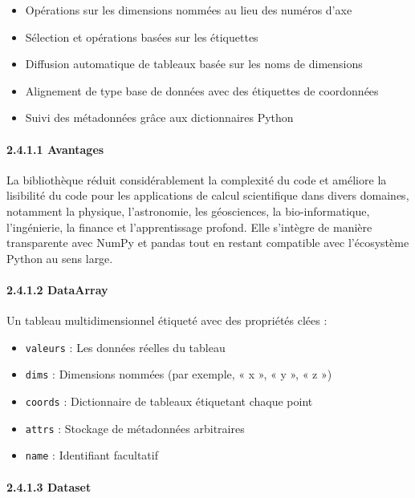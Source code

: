 \begin{itemize}
\item
  Opérations sur les dimensions nommées au lieu des numéros d'axe
\item
  Sélection et opérations basées sur les étiquettes
\item
  Diffusion automatique de tableaux basée sur les noms de dimensions
\item
  Alignement de type base de données avec des étiquettes de coordonnées
\item
  Suivi des métadonnées grâce aux dictionnaires Python
\end{itemize}

\paragraph{\texorpdfstring{{2.4.1.1}
Avantages}{2.4.1.1 Avantages}}\label{avantages}

La bibliothèque réduit considérablement la complexité du code et
améliore la lisibilité du code pour les applications de calcul
scientifique dans divers domaines, notamment la physique, l'astronomie,
les géosciences, la bio-informatique, l'ingénierie, la finance et
l'apprentissage profond. Elle s'intègre de manière transparente avec
NumPy et pandas tout en restant compatible avec l'écosystème Python au
sens large.

\paragraph{\texorpdfstring{{2.4.1.2}
DataArray}{2.4.1.2 DataArray}}\label{dataarray}

Un tableau multidimensionnel étiqueté avec des propriétés clées :

\begin{itemize}
\item
  \texttt{valeurs} : Les données réelles du tableau
\item
  \texttt{dims} : Dimensions nommées (par exemple, « x », « y », « z »)
\item
  \texttt{coords} : Dictionnaire de tableaux étiquetant chaque point
\item
  \texttt{attrs} : Stockage de métadonnées arbitraires
\item
  \texttt{name} : Identifiant facultatif
\end{itemize}

\paragraph{\texorpdfstring{{2.4.1.3}
Dataset}{2.4.1.3 Dataset}}\label{dataset}

